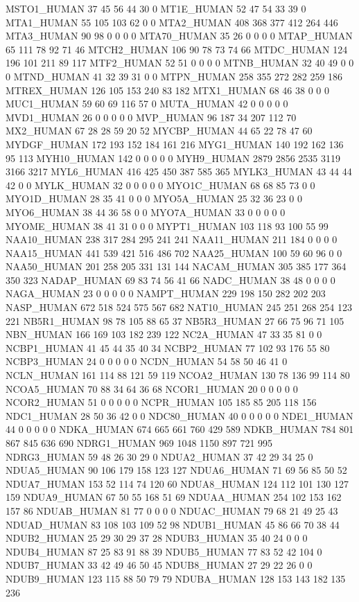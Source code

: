 MSTO1_HUMAN	37	45	56	44	30	0
MT1E_HUMAN	52	47	54	33	39	0
MTA1_HUMAN	55	105	103	62	0	0
MTA2_HUMAN	408	368	377	412	264	446
MTA3_HUMAN	90	98	0	0	0	0
MTA70_HUMAN	35	26	0	0	0	0
MTAP_HUMAN	65	111	78	92	71	46
MTCH2_HUMAN	106	90	78	73	74	66
MTDC_HUMAN	124	196	101	211	89	117
MTF2_HUMAN	52	51	0	0	0	0
MTNB_HUMAN	32	40	49	0	0	0
MTND_HUMAN	41	32	39	31	0	0
MTPN_HUMAN	258	355	272	282	259	186
MTREX_HUMAN	126	105	153	240	83	182
MTX1_HUMAN	68	46	38	0	0	0
MUC1_HUMAN	59	60	69	116	57	0
MUTA_HUMAN	42	0	0	0	0	0
MVD1_HUMAN	26	0	0	0	0	0
MVP_HUMAN	96	187	34	207	112	70
MX2_HUMAN	67	28	28	59	20	52
MYCBP_HUMAN	44	65	22	78	47	60
MYDGF_HUMAN	172	193	152	184	161	216
MYG1_HUMAN	140	192	162	136	95	113
MYH10_HUMAN	142	0	0	0	0	0
MYH9_HUMAN	2879	2856	2535	3119	3166	3217
MYL6_HUMAN	416	425	450	387	585	365
MYLK3_HUMAN	43	44	44	42	0	0
MYLK_HUMAN	32	0	0	0	0	0
MYO1C_HUMAN	68	68	85	73	0	0
MYO1D_HUMAN	28	35	41	0	0	0
MYO5A_HUMAN	25	32	36	23	0	0
MYO6_HUMAN	38	44	36	58	0	0
MYO7A_HUMAN	33	0	0	0	0	0
MYOME_HUMAN	38	41	31	0	0	0
MYPT1_HUMAN	103	118	93	100	55	99
NAA10_HUMAN	238	317	284	295	241	241
NAA11_HUMAN	211	184	0	0	0	0
NAA15_HUMAN	441	539	421	516	486	702
NAA25_HUMAN	100	59	60	96	0	0
NAA50_HUMAN	201	258	205	331	131	144
NACAM_HUMAN	305	385	177	364	350	323
NADAP_HUMAN	69	83	74	56	41	66
NADC_HUMAN	38	48	0	0	0	0
NAGA_HUMAN	23	0	0	0	0	0
NAMPT_HUMAN	229	198	150	282	202	203
NASP_HUMAN	672	518	524	575	567	682
NAT10_HUMAN	245	251	268	254	123	221
NB5R1_HUMAN	98	78	105	88	65	37
NB5R3_HUMAN	27	66	75	96	71	105
NBN_HUMAN	166	169	103	182	239	122
NC2A_HUMAN	47	33	35	81	0	0
NCBP1_HUMAN	41	45	44	35	40	34
NCBP2_HUMAN	77	102	93	176	55	80
NCBP3_HUMAN	24	0	0	0	0	0
NCDN_HUMAN	54	58	50	46	41	0
NCLN_HUMAN	161	114	88	121	59	119
NCOA2_HUMAN	130	78	136	99	114	80
NCOA5_HUMAN	70	88	34	64	36	68
NCOR1_HUMAN	20	0	0	0	0	0
NCOR2_HUMAN	51	0	0	0	0	0
NCPR_HUMAN	105	185	85	205	118	156
NDC1_HUMAN	28	50	36	42	0	0
NDC80_HUMAN	40	0	0	0	0	0
NDE1_HUMAN	44	0	0	0	0	0
NDKA_HUMAN	674	665	661	760	429	589
NDKB_HUMAN	784	801	867	845	636	690
NDRG1_HUMAN	969	1048	1150	897	721	995
NDRG3_HUMAN	59	48	26	30	29	0
NDUA2_HUMAN	37	42	29	34	25	0
NDUA5_HUMAN	90	106	179	158	123	127
NDUA6_HUMAN	71	69	56	85	50	52
NDUA7_HUMAN	153	52	114	74	120	60
NDUA8_HUMAN	124	112	101	130	127	159
NDUA9_HUMAN	67	50	55	168	51	69
NDUAA_HUMAN	254	102	153	162	157	86
NDUAB_HUMAN	81	77	0	0	0	0
NDUAC_HUMAN	79	68	21	49	25	43
NDUAD_HUMAN	83	108	103	109	52	98
NDUB1_HUMAN	45	86	66	70	38	44
NDUB2_HUMAN	25	29	30	29	37	28
NDUB3_HUMAN	35	40	24	0	0	0
NDUB4_HUMAN	87	25	83	91	88	39
NDUB5_HUMAN	77	83	52	42	104	0
NDUB7_HUMAN	33	42	49	46	50	45
NDUB8_HUMAN	27	29	22	26	0	0
NDUB9_HUMAN	123	115	88	50	79	79
NDUBA_HUMAN	128	153	143	182	135	236
